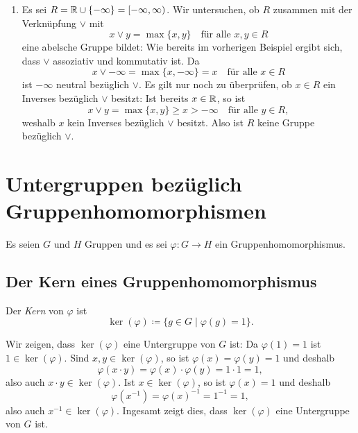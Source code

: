 \begin{enumerate}[leftmargin=*]
 \item
  Es sei $R = \mathbb{R} \cup \{-\infty\} = [-\infty,\infty)$. Wir untersuchen, ob $R$ zusammen mit der Verknüpfung $\vee$ mit
  \[
   x \vee y = \max\{x,y\} \quad \text{für alle $x,y \in R$}
  \]
  eine abelsche Gruppe bildet: Wie bereits im vorherigen Beispiel ergibt sich, dass $\vee$ assoziativ und kommutativ ist. Da
  \[
   x \vee -\infty = \max\{x,-\infty\} = x \quad \text{für alle $x \in R$}
  \]
  ist $-\infty$ neutral bezüglich $\vee$. Es gilt nur noch zu überprüfen, ob $x \in R$ ein Inverses bezüglich $\vee$ besitzt: Ist bereits $x \in \mathbb{R}$, so ist
  \[
   x \vee y = \max\{x,y\} \geq x > -\infty
   \quad
   \text{für alle $y \in R$},
  \]
  weshalb $x$ kein Inverses bezüglich $\vee$ besitzt. Also ist $R$ keine Gruppe bezüglich $\vee$.
\end{enumerate}





\section{Untergruppen bezüglich Gruppenhomomorphismen}\label{sec: subgroups and group homomorphisms}
Es seien $G$ und $H$ Gruppen und es sei $\varphi \colon G \to H$ ein Gruppenhomomorphismus.



\subsection{Der Kern eines Gruppenhomomorphismus}
\begin{defi}
 Der \emph{Kern} von $\varphi$ ist
 \[
  \ker(\varphi) \coloneqq \{g \in G \mid \varphi(g) = 1\}.
 \]
\end{defi}

Wir zeigen, dass $\ker(\varphi)$ eine Untergruppe von $G$ ist: Da $\varphi(1) = 1$ ist $1 \in \ker(\varphi)$. Sind $x,y \in \ker(\varphi)$, so ist $\varphi(x) = \varphi(y) = 1$ und deshalb
\[
 \varphi(x \cdot y)
 = \varphi(x) \cdot \varphi(y)
 = 1 \cdot 1
 = 1,
\]
also auch $x \cdot y \in \ker(\varphi)$. Ist $x \in \ker(\varphi)$, so ist $\varphi(x) = 1$ und deshalb
\[
 \varphi(x^{-1})
 = \varphi(x)^{-1}
 = 1^{-1}
 = 1,
\]
also auch $x^{-1} \in \ker(\varphi)$. Ingesamt zeigt dies, dass $\ker(\varphi)$ eine Untergruppe von $G$ ist.


